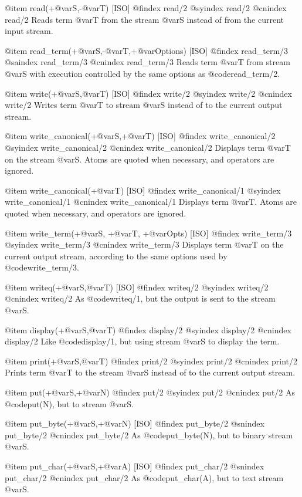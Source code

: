 {{{{{{@item read(+@var{S},-@var{T}) [ISO]
@findex read/2
@syindex read/2
@cnindex read/2
Reads term @var{T} from the stream @var{S} instead of from the current input
stream.

@item read_term(+@var{S},-@var{T},+@var{Options}) [ISO]
@findex read_term/3
@saindex read_term/3
@cnindex read_term/3
Reads term @var{T} from stream @var{S} with execution controlled by the
same options as @code{read_term/2}.

@item write(+@var{S},@var{T}) [ISO]
@findex write/2
@syindex write/2
@cnindex write/2
Writes term @var{T} to stream @var{S} instead of to the current output
stream.

@item write_canonical(+@var{S},+@var{T}) [ISO]
@findex write_canonical/2
@syindex write_canonical/2
@cnindex write_canonical/2
Displays term @var{T} on the stream @var{S}. Atoms are quoted when
necessary, and operators are ignored.

@item write_canonical(+@var{T}) [ISO]
@findex write_canonical/1
@syindex write_canonical/1
@cnindex write_canonical/1
Displays term @var{T}. Atoms are quoted when necessary, and operators
are ignored.

@item write_term(+@var{S}, +@var{T}, +@var{Opts}) [ISO]
@findex write_term/3
@syindex write_term/3
@cnindex write_term/3
Displays term @var{T} on the current output stream, according to the same
options used by @code{write_term/3}.

@item writeq(+@var{S},@var{T}) [ISO]
@findex writeq/2
@syindex writeq/2
@cnindex writeq/2
As @code{writeq/1}, but the output is sent to the stream @var{S}.

@item display(+@var{S},@var{T})
@findex display/2
@syindex display/2
@cnindex display/2
Like @code{display/1}, but using stream @var{S} to display the term.

@item print(+@var{S},@var{T})
@findex print/2
@syindex print/2
@cnindex print/2
Prints term @var{T} to the stream @var{S} instead of to the current output
stream.

@item put(+@var{S},+@var{N})
@findex put/2
@syindex put/2
@cnindex put/2
As @code{put(N)}, but to stream @var{S}.

@item put_byte(+@var{S},+@var{N}) [ISO]
@findex put_byte/2
@snindex put_byte/2
@cnindex put_byte/2
As @code{put_byte(N)}, but to binary stream @var{S}.

@item put_char(+@var{S},+@var{A}) [ISO]
@findex put_char/2
@snindex put_char/2
@cnindex put_char/2
As @code{put_char(A)}, but to text stream @var{S}.

}}}}}}
